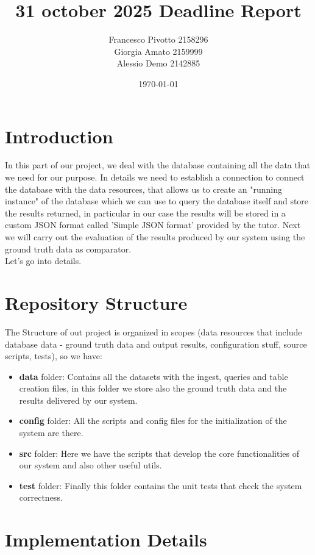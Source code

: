 \documentclass[12pt,a4paper]{article}
\title{31 october 2025 Deadline Report}
\author{Francesco Pivotto 2158296\\ Giorgia Amato 2159999\\ Alessio Demo 2142885 }
\date{\today}
\begin{document}
\maketitle

\tableofcontents
\newpage

\section{Introduction }
In this part of our project, we deal with the database containing all the data that we need for our purpose.
In details we need to establish a connection to connect the database with the data resources, that allows us to create an "running instance" of the database which we can use to query the database itself and store
the results returned, in particular in our case the results will be stored in a custom JSON format called 'Simple JSON format' provided by the tutor.
Next we will carry out the evaluation of the results  produced by our system using the ground truth data as comparator.\\
Let's go into details.

\section{Repository Structure}
The Structure of out project is organized in scopes (data resources that include database data - ground truth data and output results, configuration stuff,  source scripts, tests), so we have:\\
\begin{itemize}
    \item \textbf{data} folder: Contains all the datasets with the ingest, queries and table creation files, in this folder we store also the ground truth data and the results delivered by our system.
    \item \textbf{config} folder: All the scripts and config files for the initialization of the system are there.
    \item \textbf{src} folder: Here we have the scripts that develop the core functionalities of our system and also other useful utils. 
    \item \textbf{test} folder: Finally this folder contains the unit tests that check the system correctness.
\end{itemize}

\section{Implementation Details}
\end{document}
